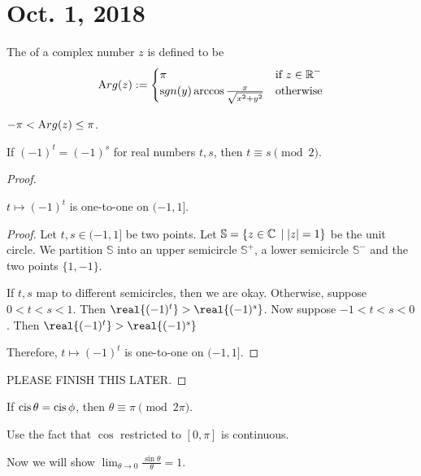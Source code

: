 \documentclass[notes]{subfile}
\begin{document}
\section{Oct. 1, 2018}

\begin{definition}
    The  of a complex number $z$ is defined to be
    \[ {\text Arg}(z) := \begin{cases}
    \pi & \text{if $z \in \operatorname{\mathbb{R}}^-$} \\
    {\text sgn}(y) \arccos{\frac{x}{\sqrt{x^2+y^2}}} & \text{otherwise}
    \end{cases} \]
\end{definition}

\begin{theorem}
    $-\pi < {\text Arg}(z) \le \pi$.
\end{theorem}

\begin{theorem}
    If $(-1)^t = (-1)^s$ for real numbers $t,s$, then $t \equiv s \pmod{2}$.
\end{theorem}

\begin{proof}
    \begin{lemma}
        $t \mapsto (-1)^t$ is one-to-one on $(-1,1]$.
    \end{lemma}

    \begin{proof}
        Let $t,s \in (-1,1]$ be two points.
        Let $\mathbb{S} = \{ z \in \operatorname{\mathbb{C}} \; | \; |z| = 1 \}$ be the unit circle.
        We partition $\mathbb{S}$ into an upper semicircle $\mathbb{S}^+$, a lower semicircle $\mathbb{S}^-$ and the two points $\{1,-1\}$.

        If $t,s$ map to different semicircles, then we are okay.
        Otherwise, suppose $0<t<s<1$.  Then $\real{(-1)^t} > \real{(-1)^s}$.
        Now suppose $-1<t<s<0$.  Then $\real{(-1)^t} > \real{(-1)^s}$

        Therefore, $t \mapsto (-1)^t$ is one-to-one on $(-1,1]$.
    \end{proof}
    PLEASE FINISH THIS LATER.

\end{proof}

\begin{cor}
    If $\operatorname{cis}{\theta} = \operatorname{cis}{\phi}$, then $\theta \equiv \pi \pmod{2\pi}$.
\end{cor}

Use the fact that $\cos$ restricted to $[0,\pi]$ is continuous.

Now we will show $\lim_{\theta \to 0} \frac{\sin \theta}{\theta} = 1$.
\end{document}
